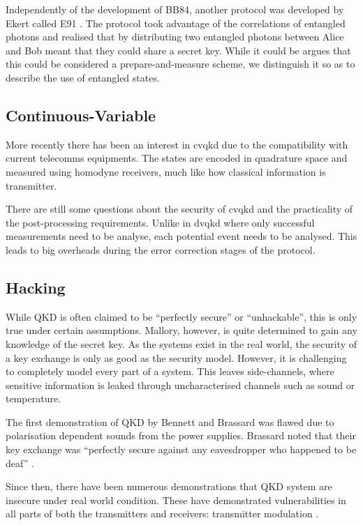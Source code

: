 Independently of the development of BB84, another protocol was developed by Ekert called E91 \cite{E91}. The protocol took advantage of the correlations of entangled photons and realised that by distributing two entangled photons between Alice and Bob meant that they could share a secret key. While it could be argues that this could be considered a prepare-and-measure scheme, we distinguish it so as to describe the use of entangled states.

\subsection{Continuous-Variable}

More recently there has been an interest in \ac{cvqkd} due to the compatibility with current telecomms equipments. The states are encoded in quadrature space and measured using homodyne receivers, much like how classical information is transmitter.

There are still some questions about the security of \ac{cvqkd} and the practicality of the post-processing requirements. Unlike in \ac{dvqkd} where only successful measurements need to be analyse, each potential event needs to be analysed. This leads to big overheads during the error correction stages of the protocol.

\subsection{Hacking}

While \ac{QKD} is often claimed to be ``perfectly secure'' or ``unhackable'', this is only true under certain assumptions.  Mallory, however, is quite determined to gain any knowledge of the secret key. As the systems exist in the real world, the security of a key exchange is only as good as the security model. However, it is challenging to completely model every part of a system. This leaves side-channels, where sensitive information is leaked through uncharacterised channels such as sound or temperature.

The first demonstration of \ac{QKD} by Bennett and Brassard was flawed due to polarisation dependent sounds from the power supplies. Brassard noted that their key exchange was ``perfectly secure against any eavesdropper who happened to be deaf'' \cite{Brassard2005}. 

Since then, there have been numerous demonstrations that \ac{QKD} system are insecure under real world condition. These have demonstrated vulnerabilities in all parts of both the transmitters and receivers: transmitter modulation \cite{Gisin2006}. 

